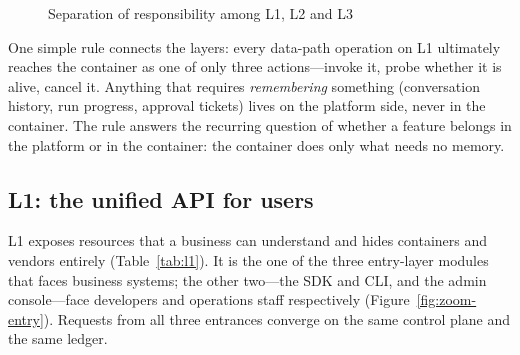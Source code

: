 \begin{figure}[htbp]
\centering
{}
\caption[The three interface layers]{Separation of responsibility among L1, L2 and L3}
\label{fig:l1l2l3}
\end{figure}

One simple rule connects the layers: every data-path operation on L1 ultimately reaches the container as one of only three actions---invoke it, probe whether it is alive, cancel it. Anything that requires \emph{remembering} something (conversation history, run progress, approval tickets) lives on the platform side, never in the container. The rule answers the recurring question of whether a feature belongs in the platform or in the container: the container does only what needs no memory.

\subsection{L1: the unified API for users}

L1 exposes resources that a business can understand and hides containers and vendors entirely (Table~\ref{tab:l1}). It is the one of the three entry-layer modules that faces business systems; the other two---the SDK and CLI, and the admin console---face developers and operations staff respectively (Figure~\ref{fig:zoom-entry}). Requests from all three entrances converge on the same control plane and the same ledger.

